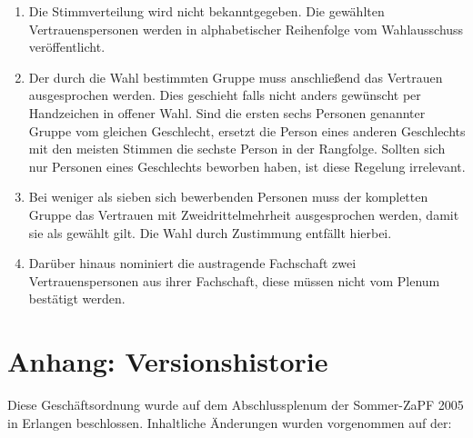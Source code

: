 \documentclass[12pt,oneside]{scrartcl}
\begin{document}
\begin{enumerate}
\item Die Stimmverteilung wird nicht bekanntgegeben.
Die gewählten Vertrauenspersonen werden in alphabetischer Reihenfolge
vom Wahlausschuss veröffentlicht.

\item Der durch die Wahl bestimmten Gruppe muss anschließend das Vertrauen
ausgesprochen werden. Dies geschieht falls nicht anders gewünscht per
Handzeichen in offener Wahl.
Sind die ersten sechs Personen genannter Gruppe vom gleichen Geschlecht,
ersetzt die Person eines anderen Geschlechts mit den meisten Stimmen die
sechste Person in der Rangfolge.
Sollten sich nur Personen eines Geschlechts beworben haben, ist diese
Regelung irrelevant.

\item Bei weniger als sieben sich bewerbenden Personen muss der kompletten
Gruppe das Vertrauen mit Zweidrittelmehrheit ausgesprochen werden,
damit sie als gewählt gilt.
Die Wahl durch Zustimmung entfällt hierbei.

\item Darüber hinaus nominiert die austragende Fachschaft zwei Vertrauenspersonen
aus ihrer Fachschaft, diese müssen nicht vom Plenum bestätigt werden.
\end{enumerate}


\section{Anhang: Versionshistorie%
  \label{anhang-versionshistorie}%
}

Diese Geschäftsordnung wurde auf dem Abschlussplenum der Sommer-ZaPF 2005 in
Erlangen beschlossen.
Inhaltliche Änderungen wurden vorgenommen auf der:
\end{document}
